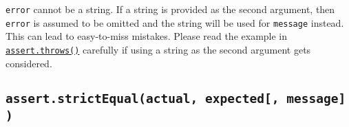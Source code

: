 \begin{Shaded}
\begin{Highlighting}[]
 \OperatorTok{;}

\NormalTok{(}
  \NormalTok{(} \NormalTok{(}\NormalTok{))}\OperatorTok{,}
  \OperatorTok{,}
\NormalTok{)}\NormalTok{(() }\KeywordTok{=\textgreater{}}\NormalTok{ \{}
\NormalTok{\})}\OperatorTok{;}
\end{Highlighting}
\end{Shaded}

\begin{Shaded}
\begin{Highlighting}[]
\OperatorTok{=} \NormalTok{(}\NormalTok{)}\OperatorTok{;}

\NormalTok{(}
  \NormalTok{(} \NormalTok{(}\NormalTok{))}\OperatorTok{,}
  \OperatorTok{,}
\NormalTok{)}\NormalTok{(() }\KeywordTok{=\textgreater{}}\NormalTok{ \{}
\NormalTok{\})}\OperatorTok{;}
\end{Highlighting}
\end{Shaded}

\texttt{error} cannot be a string. If a string is provided as the second
argument, then \texttt{error} is assumed to be omitted and the string
will be used for \texttt{message} instead. This can lead to easy-to-miss
mistakes. Please read the example in
\hyperref[assertthrowsfn-error-message]{\texttt{assert.throws()}}
carefully if using a string as the second argument gets considered.

\subsection{\texorpdfstring{\texttt{assert.strictEqual(actual,\ expected{[},\ message{]})}}{assert.strictEqual(actual, expected{[}, message{]})}}\label{assert.strictequalactual-expected-message}

